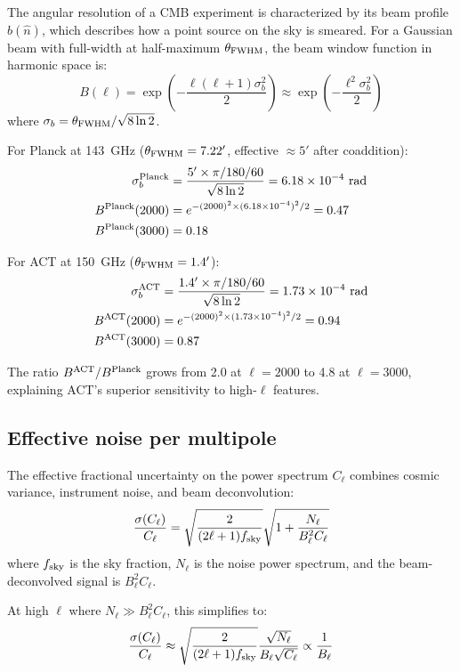 \documentclass[twocolumn,showpacs,preprintnumbers,amsmath,amssymb,prd]{revtex4-2}
\begin{document}
The angular resolution of a CMB experiment is characterized by its beam profile 
$b(\hat n)$, which describes how a point source on the sky is smeared. For a 
Gaussian beam with full-width at half-maximum $\theta_{\rm FWHM}$, the beam 
window function in harmonic space is:
\begin{equation}
B(\ell) = \exp\left(-\frac{\ell(\ell+1)\sigma_b^2}{2}\right) 
\approx \exp\left(-\frac{\ell^2\sigma_b^2}{2}\right)
\end{equation}
where $\sigma_b = \theta_{\rm FWHM}/\sqrt{8\ln 2}$.

For Planck at 143~GHz ($\theta_{\rm FWHM} = 7.22'$, effective $\approx 5'$ 
after coaddition):
\begin{align}
\sigma_b^{\rm Planck} &= \frac{5' \times \pi/180/60}{\sqrt{8\ln 2}} 
= 6.18 \times 10^{-4}~\text{rad} \\
B^{\rm Planck}(2000) &= e^{-(2000)^2 \times (6.18\times 10^{-4})^2/2} = 0.47 \\
B^{\rm Planck}(3000) &= 0.18
\end{align}

For ACT at 150~GHz ($\theta_{\rm FWHM} = 1.4'$):
\begin{align}
\sigma_b^{\rm ACT} &= \frac{1.4' \times \pi/180/60}{\sqrt{8\ln 2}} 
= 1.73 \times 10^{-4}~\text{rad} \\
B^{\rm ACT}(2000) &= e^{-(2000)^2 \times (1.73\times 10^{-4})^2/2} = 0.94 \\
B^{\rm ACT}(3000) &= 0.87
\end{align}

The ratio $B^{\rm ACT}/B^{\rm Planck}$ grows from 2.0 at $\ell = 2000$ to 4.8 
at $\ell = 3000$, explaining ACT's superior sensitivity to high-$\ell$ features.

\subsection{Effective noise per multipole}

The effective fractional uncertainty on the power spectrum $C_\ell$ combines 
cosmic variance, instrument noise, and beam deconvolution:
\begin{equation}
\frac{\sigma(C_\ell)}{C_\ell} = \sqrt{\frac{2}{(2\ell+1)f_{\rm sky}}} 
\sqrt{1 + \frac{N_\ell}{B_\ell^2 C_\ell}}
\end{equation}
where $f_{\rm sky}$ is the sky fraction, $N_\ell$ is the noise power spectrum, 
and the beam-deconvolved signal is $B_\ell^2 C_\ell$.

At high $\ell$ where $N_\ell \gg B_\ell^2 C_\ell$, this simplifies to:
\begin{equation}
\frac{\sigma(C_\ell)}{C_\ell} \approx \sqrt{\frac{2}{(2\ell+1)f_{\rm sky}}} 
\frac{\sqrt{N_\ell}}{B_\ell \sqrt{C_\ell}} \propto \frac{1}{B_\ell}
\end{equation}
\end{document}
